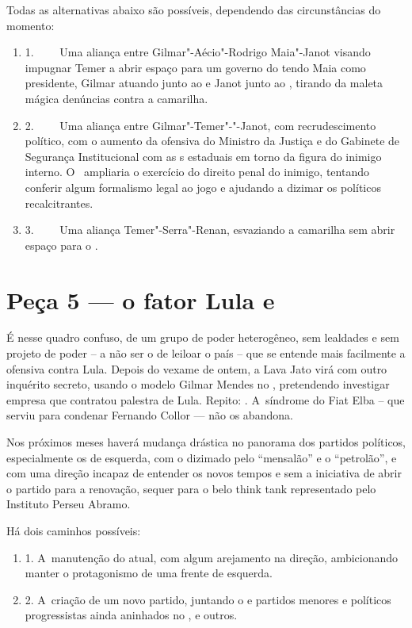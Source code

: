 Todas as alternativas abaixo são possíveis, dependendo das
circunstâncias do momento:

\begin{enumerate}
\itemsep1pt\parskip0pt
\item
  1.~~~~ Uma aliança entre Gilmar"-Aécio"-Rodrigo Maia"-Janot visando
  impugnar Temer a abrir espaço para um governo do  tendo Maia como
  presidente, Gilmar atuando junto ao  e Janot junto ao , tirando
  da maleta mágica denúncias contra a camarilha.
\item
  2.~~~~ Uma aliança entre Gilmar"-Temer"-"-Janot, com recrudescimento
  político, com o aumento da ofensiva do Ministro da Justiça e do
  Gabinete de Segurança Institucional com as s estaduais em torno da
  figura do inimigo interno. O~ ampliaria o exercício do direito
  penal do inimigo, tentando conferir algum formalismo legal ao jogo e
  ajudando a dizimar os políticos recalcitrantes.
\item
  3.~~~~ Uma aliança Temer"-Serra"-Renan, esvaziando a camarilha sem abrir
  espaço para o .
\end{enumerate}

\section{Peça 5 --- o fator Lula e ~~}

É nesse quadro confuso, de um grupo de poder heterogêneo, sem lealdades
e sem projeto de poder -- a não ser o de leiloar o país -- que se
entende mais facilmente a ofensiva contra Lula. Depois do vexame de
ontem, a Lava Jato virá com outro inquérito secreto, usando o modelo
Gilmar Mendes no , pretendendo investigar  empresa que contratou
 palestra de Lula. Repito: . A~síndrome do Fiat Elba -- que serviu
para condenar Fernando Collor --- não os abandona.

Nos próximos meses haverá mudança drástica no panorama dos partidos
políticos, especialmente os de esquerda, com o  dizimado pelo
``mensalão'' e o ``petrolão'', e com uma direção incapaz de entender os
novos tempos e sem a iniciativa de abrir o partido para a renovação,
sequer para o belo think tank representado pelo Instituto Perseu Abramo.

Há dois caminhos possíveis:

\begin{enumerate}
\itemsep1pt\parskip0pt
\item
  1. A~manutenção do  atual, com algum arejamento na direção,
  ambicionando manter o protagonismo de uma frente de esquerda.
\item
  2. A~criação de um novo partido, juntando o  e partidos menores e
  políticos progressistas ainda aninhados no ,  e outros.
\end{enumerate}

